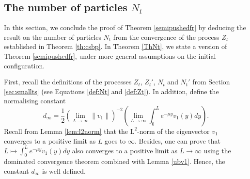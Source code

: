 \documentclass[11pt]{article}
\theoremstyle{plain}
\newcommand\vep{\varepsilon}
\begin{document}
%



\subsection{The number of particles $N_t$} \label{nbrpart:CSBP}
In this section, we conclude the proof of Theorem \ref{semipushedfr} by deducing the result on the number of particles $N_t$ from the convergence of the process $Z_t$ established in Theorem \ref{th:csbp}.  In Theorem \ref{ThNt}, we state a version of Theorem \ref{semipushedfr}, under more general assumptions on the initial configuration.

First, recall  the definitions of the processes $Z_t$, $Z_t'$, $N_t$ and $N_t'$ from Section \ref{sec:smallts} (see Equations \eqref{def:Nt} and \eqref{def:Zt}).
In addition, define the normalising constant 
 \begin{equation}
\label{nc}
d_{\infty}=\frac{1}{2}\left(\lim\limits_{L\rightarrow\infty}\|v_1\|\right)^{-2}\left(\lim\limits_{L\rightarrow\infty}\int_0^Le^{-\mu y} v_1(y)dy\right).
\end{equation} 
Recall from Lemma \ref{lem:l2norm} that the $\mathrm{L}^2$-norm of the eigenvector $v_1$ converges to a positive limit as $L$ goes to $\infty$. Besides, one can prove that $L\mapsto \int_0^Le^{-\mu y} v_1(y)dy$ also converges to a positive limit as $L\to \infty$ using the dominated convergence theorem combined with Lemma \ref{ubv1}. Hence, the constant $d_{\infty}$ is well defined.
\end{document}
